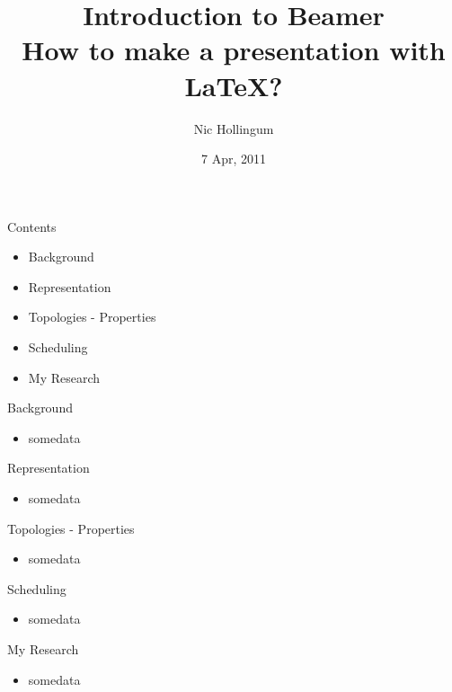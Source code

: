 \documentclass{beamer}
\title[Make a LaTeX presentation using Beamer]{Introduction  to Beamer\\How to make a presentation with LaTeX?}
\author{Nic Hollingum}
\institute{USYD}
\date{7 Apr, 2011}
\begin{document}
\begin{frame}
\titlepage
\end{frame}


\begin{frame}{Contents}
\begin{itemize}
	\item Background
	\item Representation
	\item Topologies - Properties
	\item Scheduling
	\item My Research
\end{itemize}
\end{frame}

\begin{frame}{Background}
\begin{itemize}
	\item somedata
\end{itemize}
\end{frame}

\begin{frame}{Representation}
\begin{itemize}
	\item somedata\cite{lee87}
\end{itemize}
\end{frame}

\begin{frame}{Topologies - Properties}
\begin{itemize}
	\item somedata
\end{itemize}
\end{frame}

\begin{frame}{Scheduling}
\begin{itemize}
	\item somedata
\end{itemize}
\end{frame}

\begin{frame}{My Research}
\begin{itemize}
	\item somedata
\end{itemize}
\end{frame}

\end{document}
